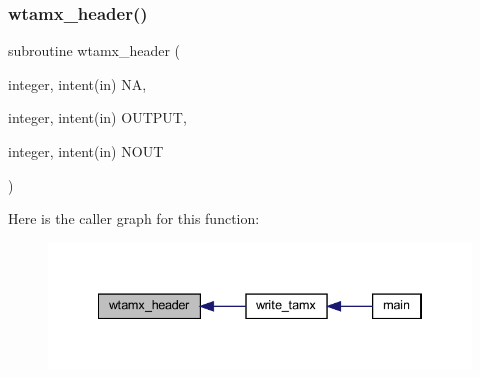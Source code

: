 \subsubsection{\texorpdfstring{wtamx\+\_\+header()}{wtamx\_header()}}
{\footnotesize\ttfamily subroutine wtamx\+\_\+header (\begin{DoxyParamCaption}\item[{integer, intent(in)}]{NA,  }\item[{integer, intent(in)}]{O\+U\+T\+P\+UT,  }\item[{integer, intent(in)}]{N\+O\+UT }\end{DoxyParamCaption})}

Here is the caller graph for this function\+:
\nopagebreak
\begin{figure}[H]
\begin{center}
\leavevmode
\includegraphics[width=334pt]{Marco_8f90_acd10a637c4ea5997d217c8927618ed95_icgraph}
\end{center}
\end{figure}
\mbox{\label{Marco_8f90_a957825940d4c1d1ff2eabfb92165404e}} 
